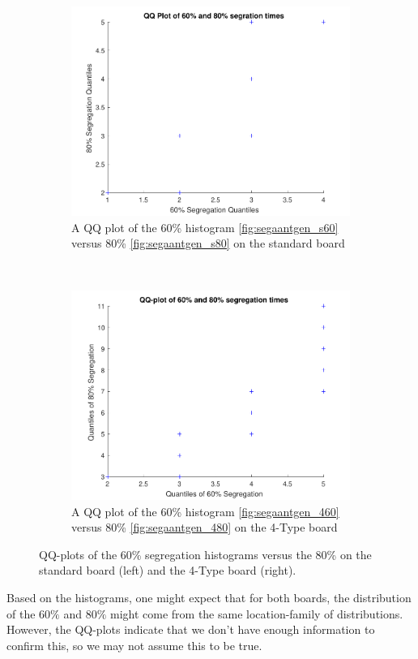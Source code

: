 \begin{figure}[H]
\centering
\begin{subfigure}{0.45\textwidth}
    \includegraphics[width=\textwidth]{./60_80_segregation_aantgen/60_80_QQ_plot.pdf}
    \caption{A QQ plot of the 60\% histogram  \ref{fig:segaantgen_s60} versus 80\% \ref{fig:segaantgen_s80} on the standard board}
    \label{fig:qqplotsegaantgen_s}
\end{subfigure}
~
\begin{subfigure}{0.45\textwidth}
    \includegraphics[width=\textwidth]{./60_80_segregation_aantgen/4TypeBoard/60_80_QQ_plot.pdf}
    \caption{A QQ plot of the 60\% histogram  \ref{fig:segaantgen_460} versus 80\% \ref{fig:segaantgen_480} on the 4-Type board}
    \label{fig:qqplotsegaantgen_4}
\end{subfigure}
\caption{QQ-plots of the 60\% segregation histograms versus the 80\% on the standard board (left) and the 4-Type board (right).}
\label{fig:QQhistseg}
\end{figure}
Based on the histograms, one might expect that for both boards, the distribution of the $60\%$ and $80\%$ might come from  the same location-family of distributions. However, the QQ-plots indicate that we don't have enough information to confirm this, so we may not assume this to be true.\\

